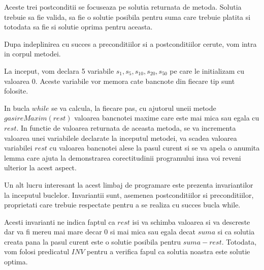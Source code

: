\par
\vspace{0.25cm}
Aceste trei postconditii se focuseaza pe solutia returnata de metoda. Solutia trebuie sa fie valida, sa fie o solutie posibila pentru suma care trebuie platita si totodata sa fie si solutie oprima pentru aceasta.
\par 
Dupa indeplinirea cu succes a preconditiilor si a postconditiilor cerute, vom intra in corpul metodei. \par 
La inceput, vom declara 5 variabile $s_1, s_5 , s_{10}, s_{20}, s_{50}$ pe care le initializam cu valoarea 0. Aceste variabile vor memora cate bancnote din fiecare tip sunt folosite. \par 
In bucla $while$ se va calcula, la fiecare pas, cu ajutorul uneii metode $gasireMaxim(rest)$ valoarea bancnotei maxime care este mai mica sau egala cu $rest$. In functie de valoarea returnata de aceasta metoda, se va incrementa valoarea unei variabilele declarate la inceputul metodei, va scadea valoarea variabilei $rest$ cu valoarea bancnotei alese la pasul curent si se va apela o anumita lemma care ajuta la demonstrarea corectitudinii programului insa voi reveni ulterior la acest aspect.
\par 

Un alt lucru interesant la acest limbaj de programare este prezenta invariantilor la inceputul buclelor. Invariantii sunt, asemenea postconditiilor si preconditiilor, proprietati care trebuie respectate pentru a se realiza cu succes bucla while.

\vspace{0.5cm}
\par 
\vspace{0.5cm}
Acesti invarianti ne indica faptul ca $rest$ isi va schimba valoarea si va descreste dar va fi mereu mai mare decar 0 si mai mica sau egala decat $suma$ si ca solutia creata pana la pasul curent este o solutie posibila pentru $suma-rest$. 
Totodata, vom folosi predicatul $INV$ pentru a verifica fapul ca solutia noastra este solutie optima. 
\par
